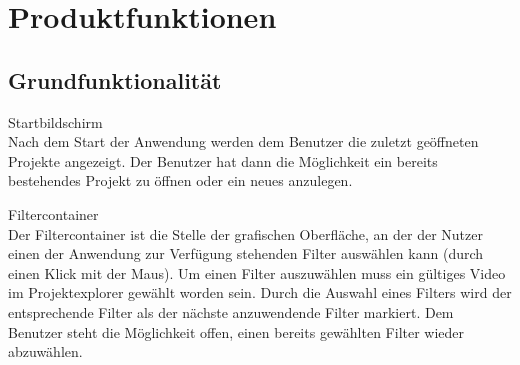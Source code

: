\chapter {Produktfunktionen}

\section{Grundfunktionalität}
\setcounter{counterKriterien}{0}

 Startbildschirm \\
Nach dem Start der Anwendung werden dem Benutzer die zuletzt geöffneten Projekte angezeigt. Der Benutzer
hat dann die Möglichkeit ein bereits bestehendes Projekt zu öffnen oder ein neues anzulegen.
 
 Filtercontainer \\
Der Filtercontainer ist die Stelle der grafischen Oberfläche, an der der Nutzer einen der Anwendung
zur Verfügung stehenden Filter auswählen kann (durch einen Klick mit der Maus). Um einen Filter auszuwählen
muss ein gültiges Video im Projektexplorer gewählt worden sein. Durch die Auswahl eines Filters wird
der entsprechende Filter als der nächste anzuwendende Filter markiert. Dem Benutzer steht die Möglichkeit offen, einen bereits gewählten Filter wieder abzuwählen.

